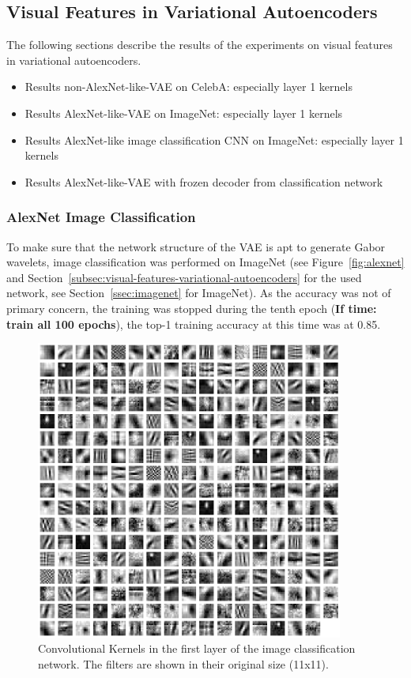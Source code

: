\subsection{Visual Features in Variational Autoencoders}\label{subsec:results_visual_features_in_variational_autoencoders}
The following sections describe the results of the experiments on visual features in variational autoencoders.

\begin{itemize}
    \item Results non-AlexNet-like-VAE on CelebA: especially layer 1 kernels
    \item Results AlexNet-like-VAE on ImageNet: especially layer 1 kernels
    \item Results AlexNet-like image classification CNN on ImageNet: especially layer 1 kernels
    \item Results AlexNet-like-VAE with frozen decoder from classification network
\end{itemize}

\subsubsection{AlexNet Image Classification}
To make sure that the network structure of the \ac{VAE} is apt to generate Gabor wavelets, image classification was performed on ImageNet (see Figure~\ref{fig:alexnet} and Section~\ref{subsec:visual-features-variational-autoencoders} for the used network, see Section~\ref{ssec:imagenet} for ImageNet).
As the accuracy was not of primary concern, the training was stopped during the tenth epoch (\textbf{If time: train all 100 epochs}), the top-1 training accuracy at this time was at 0.85.

\begin{figure}
    \centering
    \includegraphics[width=0.9\textwidth]{images/alexnet_classification_l1_kernels.png}
    \caption[Image classification - Layer 1 Kernels]{Convolutional Kernels in the first layer of the image classification network. The filters are shown in their original size (11x11).}
    \label{fig:classification_layer1_kernels}
\end{figure}

